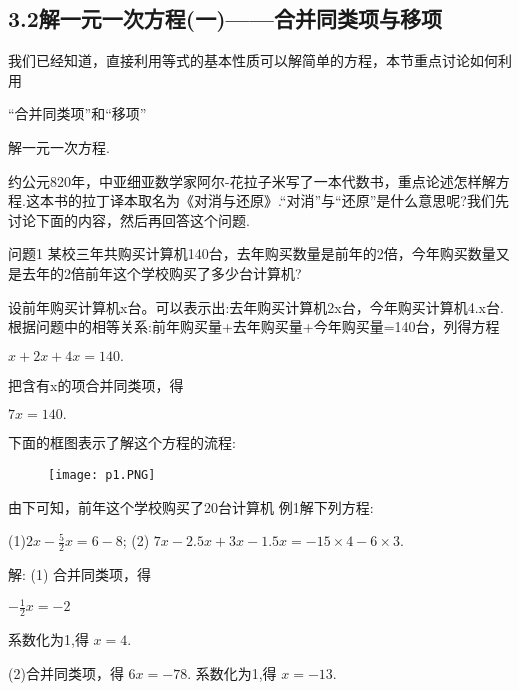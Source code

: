 \documentclass{article}
\date{}
\begin{document}
\title{}
\maketitle
\subsection*{ 3.2解一元一次方程(一)——合并同类项与移项}

\begin{article}
    \indent 我们已经知道，直接利用等式的基本性质可以解简单的方程，本节重点讨论如何利用\begin{definition}“合并同类项”和“移项”\end{definition}解一元一次方程.
    
    \indent 约公元820年，中亚细亚数学家阿尔-花拉子米写了一本代数书，重点论述怎样解方程.这本书的拉丁译本取名为《对消与还原》.“对消”与“还原”是什么意思呢?我们先讨论下面的内容，然后再回答这个问题.
    
    \begin{example}
    \indent  问题1 某校三年共购买计算机140台，去年购买数量是前年的2倍，今年购买数量又是去年的2倍前年这个学校购买了多少台计算机?
    
    \indent 设前年购买计算机x台。可以表示出:去年购买计算机2x台，今年购买计算机4.x台.根据问题中的相等关系:前年购买量+去年购买量+今年购买量=140台，列得方程
    \begin{center}$x+2x+4x=140.$\end{center}
    
    \indent 把含有x的项合并同类项，得
    \begin{center}$7x= 140.$\end{center}

     \indent 下面的框图表示了解这个方程的流程:
     \begin{figure}
         \centering
         \texttt{[image: p1.PNG]}
     \end{figure}
     
     \indent 由下可知，前年这个学校购买了20台计算机
     \newpage 
      例1解下列方程:      
     
      (1)$ 2x-\frac{5}{2}x=6-8$;  (2) $7x-2.5x+3x-1.5x=-15\times4-6\times3$.
      
      解: (1) 合并同类项，得  
      
      $-\frac{1}{2}x=-2$
      
      系数化为1,得      
      $x=4$.
      
      (2)合并同类项，得     
     $6x=-78$.
      系数化为1,得      
      $x=-13$. 
      

\end{example}
\end{article}
\end{document}
